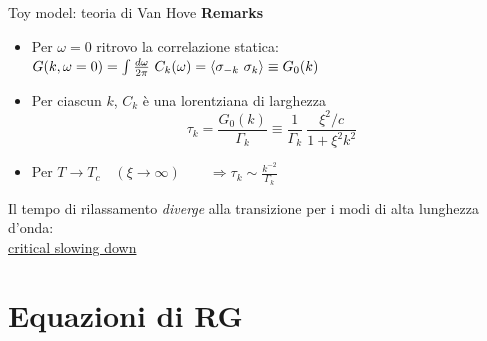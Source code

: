 \documentclass[10pt]{beamer}
\begin{document}
\begin{frame}{Toy model: teoria di Van Hove}
 \textbf{Remarks}
 \begin{itemize}
  \item Per $\omega = 0$ ritrovo la correlazione statica:\\
  $G(k,\omega = 0) = \int \frac{d\omega}{2\pi} \ C_k(\omega) = \mean{\sigma_{-k}\ \sigma_k} \equiv G_0(k)$
  \item Per ciascun $k$, $C_k$ è una lorentziana di larghezza
  \begin{equation*}
   \displaystyle \tau_k = \frac{G_0(k)}{\Gamma_k} \equiv \frac{1}{\Gamma_k}\ \frac{\xi^2/c}{1+\xi^2 k^2}
  \end{equation*}
  
  \item Per $T \to T_c \quad \left( \xi \to \infty\right) \qquad \Longrightarrow \displaystyle \tau_k \sim \frac{k^{-2}}{\Gamma_k}$
 \end{itemize}
 Il tempo di rilassamento \emph{diverge} alla transizione per i modi di alta lunghezza d'onda:\\
    \centering \underline{critical slowing down}

\end{frame}



\section{Equazioni di RG}
\end{document}
